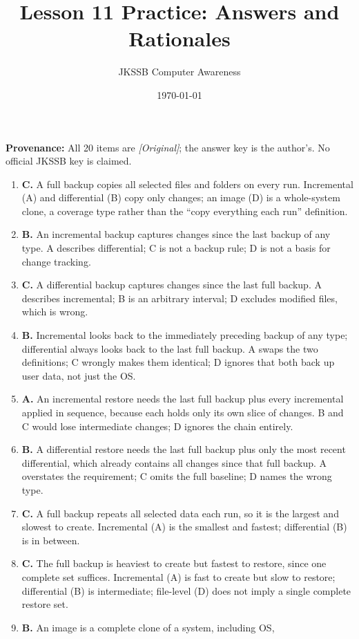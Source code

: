 \documentclass[11pt]{article}
\title{Lesson 11 Practice: Answers and Rationales}
\author{JKSSB Computer Awareness}
\date{\today}
\begin{document}
\maketitle
\noindent\textbf{Provenance:} All 20 items are \textit{[Original]};
the answer key is the author's. No official JKSSB key is claimed.
\begin{enumerate}[label=\textbf{Q\arabic*.}, leftmargin=*]
\item \textbf{C.} A full backup copies all selected files and folders on every
  run. Incremental (A) and differential (B) copy only changes; an image (D)
  is a whole-system clone, a coverage type rather than the ``copy everything
  each run'' definition.
\item \textbf{B.} An incremental backup captures changes since the last backup
  of any type. A describes differential; C is not a backup rule; D is not a
  basis for change tracking.
\item \textbf{C.} A differential backup captures changes since the last full
  backup. A describes incremental; B is an arbitrary interval; D excludes
  modified files, which is wrong.
\item \textbf{B.} Incremental looks back to the immediately preceding backup
  of any type; differential always looks back to the last full backup. A
  swaps the two definitions; C wrongly makes them identical; D ignores that
  both back up user data, not just the OS.
\item \textbf{A.} An incremental restore needs the last full backup plus every
  incremental applied in sequence, because each holds only its own slice of
  changes. B and C would lose intermediate changes; D ignores the chain
  entirely.
\item \textbf{B.} A differential restore needs the last full backup plus only
  the most recent differential, which already contains all changes since that
  full backup. A overstates the requirement; C omits the full baseline; D
  names the wrong type.
\item \textbf{C.} A full backup repeats all selected data each run, so it is
  the largest and slowest to create. Incremental (A) is the smallest and
  fastest; differential (B) is in between.
\item \textbf{C.} The full backup is heaviest to create but fastest to
  restore, since one complete set suffices. Incremental (A) is fast to create
  but slow to restore; differential (B) is intermediate; file-level (D) does
  not imply a single complete restore set.
\item \textbf{B.} An image is a complete clone of a system, including OS,

\end{enumerate}
\end{document}
